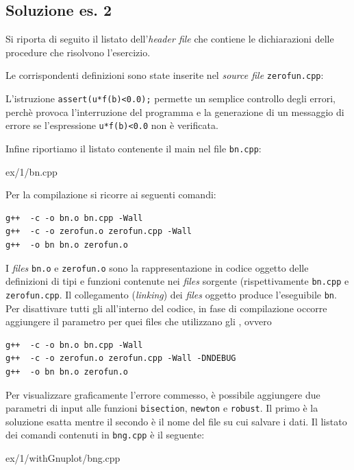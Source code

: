 \subsection*{Soluzione es. 2}

Si riporta di seguito il listato dell'\emph{header file} che contiene
le dichiarazioni delle procedure che risolvono l'esercizio.
\lstset{basicstyle=\scriptsize\sf}
    
\lstset{basicstyle=\sf}

Le corrispondenti definizioni sono state inserite nel \emph{source file}
\texttt{zerofun.cpp}:
\lstset{basicstyle=\scriptsize\sf}
    
\lstset{basicstyle=\sf}

L'istruzione \texttt{assert(u*f(b)<0.0);} permette un semplice controllo degli errori,
perch\`e provoca l'interruzione del programma e la generazione di un
messaggio di errore se l'espressione \texttt{u*f(b)<0.0} non \`e verificata.

Infine riportiamo il listato contenente il main nel file \texttt{bn.cpp}:
\lstset{basicstyle=\scriptsize\sf}
    
    {ex/1/bn.cpp}
\lstset{basicstyle=\sf}

Per la compilazione si ricorre ai seguenti comandi:
\begin{verbatim}
g++  -c -o bn.o bn.cpp -Wall
g++  -c -o zerofun.o zerofun.cpp -Wall
g++  -o bn bn.o zerofun.o
\end{verbatim}

I \emph{files} \texttt{bn.o} e \texttt{zerofun.o} sono la
rappresentazione in codice oggetto delle definizioni di tipi e
funzioni contenute nei \emph{files} sorgente
(rispettivamente \texttt{bn.cpp} e \texttt{zerofun.cpp}.
Il collegamento (\emph{linking}) dei \emph{files} oggetto
produce l'eseguibile \texttt{bn}.
Per disattivare tutti gli  all'interno del codice,
in fase di compilazione occorre aggiungere il parametro 
per quei files che utilizzano gli , ovvero
\begin{verbatim}
g++  -c -o bn.o bn.cpp -Wall
g++  -c -o zerofun.o zerofun.cpp -Wall -DNDEBUG
g++  -o bn bn.o zerofun.o
\end{verbatim}

Per visualizzare graficamente l'errore commesso, \`e possibile
aggiungere due parametri di input alle funzioni \texttt{bisection},
\texttt{newton} e \texttt{robust}.
Il primo \`e la soluzione esatta mentre il secondo \`e il nome del
file su cui salvare i dati.
Il listato dei comandi contenuti in \texttt{bng.cpp} \`e il seguente:
\lstset{basicstyle=\scriptsize\sf}
    
        {ex/1/withGnuplot/bng.cpp}
\lstset{basicstyle=\sf}

